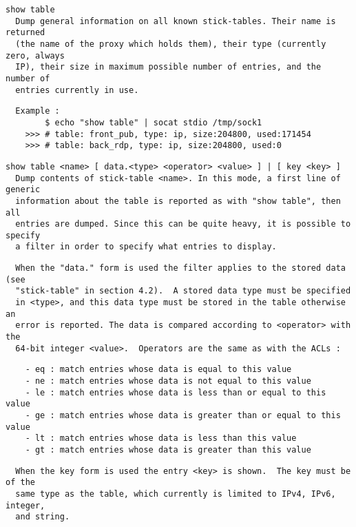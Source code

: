 \begin{verbatim}
show table
  Dump general information on all known stick-tables. Their name is returned
  (the name of the proxy which holds them), their type (currently zero, always
  IP), their size in maximum possible number of entries, and the number of
  entries currently in use.
\end{verbatim}

\begin{verbatim}
  Example :
        $ echo "show table" | socat stdio /tmp/sock1
    >>> # table: front_pub, type: ip, size:204800, used:171454
    >>> # table: back_rdp, type: ip, size:204800, used:0
\end{verbatim}

\begin{verbatim}
show table <name> [ data.<type> <operator> <value> ] | [ key <key> ]
  Dump contents of stick-table <name>. In this mode, a first line of generic
  information about the table is reported as with "show table", then all
  entries are dumped. Since this can be quite heavy, it is possible to specify
  a filter in order to specify what entries to display.
\end{verbatim}

\begin{verbatim}
  When the "data." form is used the filter applies to the stored data (see
  "stick-table" in section 4.2).  A stored data type must be specified
  in <type>, and this data type must be stored in the table otherwise an
  error is reported. The data is compared according to <operator> with the
  64-bit integer <value>.  Operators are the same as with the ACLs :
\end{verbatim}

\begin{verbatim}
    - eq : match entries whose data is equal to this value
    - ne : match entries whose data is not equal to this value
    - le : match entries whose data is less than or equal to this value
    - ge : match entries whose data is greater than or equal to this value
    - lt : match entries whose data is less than this value
    - gt : match entries whose data is greater than this value
\end{verbatim}

\begin{verbatim}
  When the key form is used the entry <key> is shown.  The key must be of the
  same type as the table, which currently is limited to IPv4, IPv6, integer,
  and string.
\end{verbatim}

